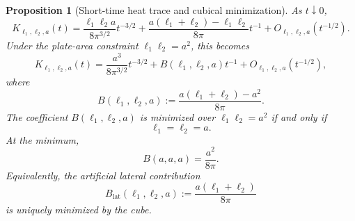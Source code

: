 \documentclass[11pt]{article}
\newtheorem{proposition}[theorem]{Proposition}
\begin{document}
\begin{proposition}[Short-time heat trace and cubical minimization]
\label{prop:heat-trace-cube-selection}
As \(t\downarrow0\),
\begin{equation}
    K_{\ell_1,\ell_2,a}(t)
    =
    \frac{\ell_1\ell_2a}{8\pi^{3/2}}t^{-3/2}
    +
    \frac{a(\ell_1+\ell_2)-\ell_1\ell_2}{8\pi}t^{-1}
    +
    O_{\ell_1,\ell_2,a}(t^{-1/2}).
    \label{eq:mixed-cell-heat-trace-expansion}
\end{equation}
Under the plate-area constraint \(\ell_1\ell_2=a^2\), this becomes
\begin{equation}
    K_{\ell_1,\ell_2,a}(t)
    =
    \frac{a^3}{8\pi^{3/2}}t^{-3/2}
    +
    B(\ell_1,\ell_2,a)t^{-1}
    +
    O_{\ell_1,\ell_2,a}(t^{-1/2}),
    \label{eq:mixed-cell-heat-trace-expansion-area}
\end{equation}
where
\begin{equation}
    B(\ell_1,\ell_2,a)
    :=
    \frac{a(\ell_1+\ell_2)-a^2}{8\pi}.
    \label{eq:mixed-cell-B-coefficient}
\end{equation}
The coefficient \(B(\ell_1,\ell_2,a)\) is minimized over
\(\ell_1\ell_2=a^2\) if and only if
\[
    \ell_1=\ell_2=a.
\]
At the minimum,
\begin{equation}
    B(a,a,a)=\frac{a^2}{8\pi}.
    \label{eq:B-cube-value}
\end{equation}
Equivalently, the artificial lateral contribution
\[
    B_{\mathrm{lat}}(\ell_1,\ell_2,a)
    :=
    \frac{a(\ell_1+\ell_2)}{8\pi}
    \label{eq:lateral-heat-coefficient}
\]
is uniquely minimized by the cube.
\end{proposition}
\end{document}
